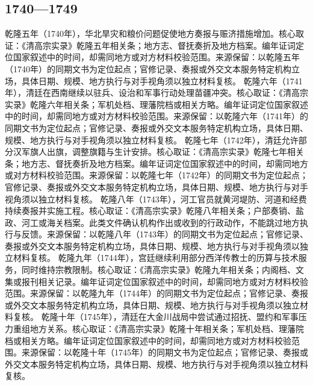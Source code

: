 \subsection{1740—1749}
乾隆五年（1740年），华北旱灾和粮价问题促使地方奏报与赈济措施增加。核心取证：《清高宗实录》乾隆五年相关条；地方志、督抚奏折及地方档案。编年证词定位国家叙述中的时间，却需同地方或对方材料校验范围。来源保留：以乾隆五年（1740年）的同期文书为定位起点；官修记录、奏报或外交文本服务特定机构立场，具体日期、规模、地方执行与对手视角须以独立材料复核。
乾隆六年（1741年），清廷在西南继续以驻兵、设治和军事行动处理苗疆冲突。核心取证：《清高宗实录》乾隆六年相关条；军机处档、理藩院档或相关方略。编年证词定位国家叙述中的时间，却需同地方或对方材料校验范围。来源保留：以乾隆六年（1741年）的同期文书为定位起点；官修记录、奏报或外交文本服务特定机构立场，具体日期、规模、地方执行与对手视角须以独立材料复核。
乾隆七年（1742年），清廷允许部分汉军旗人出旗，调整旗籍与生计安排。核心取证：《清高宗实录》乾隆七年相关条；地方志、督抚奏折及地方档案。编年证词定位国家叙述中的时间，却需同地方或对方材料校验范围。来源保留：以乾隆七年（1742年）的同期文书为定位起点；官修记录、奏报或外交文本服务特定机构立场，具体日期、规模、地方执行与对手视角须以独立材料复核。
乾隆八年（1743年），河工官员就黄河堤防、河道和经费持续奏报并实施工程。核心取证：《清高宗实录》乾隆八年相关条；户部奏销、盐政、河工或海关档案。此类文件确认机构作出或收到的行政动作，不能跳过地方执行与反馈。来源保留：以乾隆八年（1743年）的同期文书为定位起点；官修记录、奏报或外交文本服务特定机构立场，具体日期、规模、地方执行与对手视角须以独立材料复核。
乾隆九年（1744年），宫廷继续利用部分西洋传教士的历算与技术服务，同时维持宗教限制。核心取证：《清高宗实录》乾隆九年相关条；内阁档、文集或报刊相关记录。编年证词定位国家叙述中的时间，却需同地方或对方材料校验范围。来源保留：以乾隆九年（1744年）的同期文书为定位起点；官修记录、奏报或外交文本服务特定机构立场，具体日期、规模、地方执行与对手视角须以独立材料复核。
乾隆十年（1745年），清廷在大金川战局中尝试通过招抚、盟约和军事压力重组地方关系。核心取证：《清高宗实录》乾隆十年相关条；军机处档、理藩院档或相关方略。编年证词定位国家叙述中的时间，却需同地方或对方材料校验范围。来源保留：以乾隆十年（1745年）的同期文书为定位起点；官修记录、奏报或外交文本服务特定机构立场，具体日期、规模、地方执行与对手视角须以独立材料复核。

